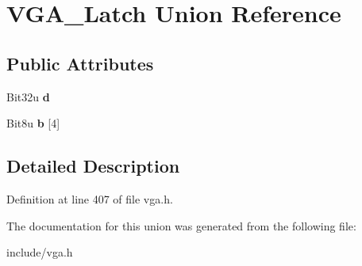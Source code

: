 \hypertarget{unionVGA__Latch}{\section{V\-G\-A\-\_\-\-Latch Union Reference}
\label{unionVGA__Latch}
}
\subsection*{Public Attributes}
\begin{DoxyCompactItemize}
\item 
\hypertarget{unionVGA__Latch_a68ae346aa35c3835ad2b7c988e9b53e6}{Bit32u {\bfseries d}}\label{unionVGA__Latch_a68ae346aa35c3835ad2b7c988e9b53e6}

\item 
\hypertarget{unionVGA__Latch_a2c3c0ab6db68a5db80e2f71639b089e1}{Bit8u {\bfseries b} \mbox{[}4\mbox{]}}\label{unionVGA__Latch_a2c3c0ab6db68a5db80e2f71639b089e1}

\end{DoxyCompactItemize}


\subsection{Detailed Description}


Definition at line 407 of file vga.\-h.



The documentation for this union was generated from the following file\-:\begin{DoxyCompactItemize}
\item 
include/vga.\-h\end{DoxyCompactItemize}
